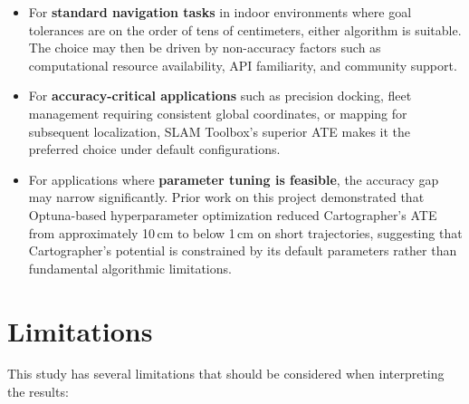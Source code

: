 \begin{itemize}
\item For \textbf{standard navigation tasks} in indoor environments where goal tolerances are on the order of tens of centimeters, either algorithm is suitable. The choice may then be driven by non-accuracy factors such as computational resource availability, API familiarity, and community support.

\item For \textbf{accuracy-critical applications} such as precision docking, fleet management requiring consistent global coordinates, or mapping for subsequent localization, SLAM Toolbox's superior ATE makes it the preferred choice under default configurations.

\item For applications where \textbf{parameter tuning is feasible}, the accuracy gap may narrow significantly. Prior work on this project demonstrated that Optuna-based hyperparameter optimization reduced Cartographer's ATE from approximately 10\,cm to below 1\,cm on short trajectories, suggesting that Cartographer's potential is constrained by its default parameters rather than fundamental algorithmic limitations.
\end{itemize}

\section{Limitations}

This study has several limitations that should be considered when interpreting the results:

